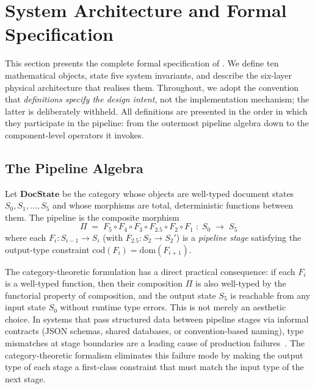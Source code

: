 \section{System Architecture and Formal Specification}
\label{sec:architecture}

This section presents the complete formal specification of \sys{}.
We define ten mathematical objects, state five system invariants, and describe the
six-layer physical architecture that realises them.
Throughout, we adopt the convention that \emph{definitions specify the design intent},
not the implementation mechanism; the latter is deliberately withheld.
All definitions are presented in the order in which they participate in the pipeline:
from the outermost pipeline algebra down to the component-level operators it invokes.

\subsection{The Pipeline Algebra}

\begin{definition}
\label{def:pipeline}
Let $\mathbf{DocState}$ be the category whose objects are well-typed document states
$S_0,S_1,\ldots,S_5$ and whose morphisms are total, deterministic functions between them.
The \sys{} pipeline is the composite morphism
\[
  \Pi \;=\; F_5 \circ F_4 \circ F_3 \circ F_{2.5} \circ F_2 \circ F_1
  \;:\; S_0 \;\longrightarrow\; S_5
\]
where each $F_i : S_{i-1} \to S_i$ (with $F_{2.5}: S_2 \to S_2'$) is a \emph{pipeline stage}
satisfying the output-type constraint $\mathrm{cod}(F_i)=\mathrm{dom}(F_{i+1})$.
\end{definition}

The category-theoretic formulation has a direct practical consequence: if each $F_i$
is a well-typed function, then their composition $\Pi$ is also well-typed by the
functorial property of composition, and the output state $S_5$ is reachable from any
input state $S_0$ without runtime type errors.
This is not merely an aesthetic choice.
In systems that pass structured data between pipeline stages via informal contracts
(JSON schemas, shared databases, or convention-based naming), type mismatches at stage
boundaries are a leading cause of production failures~\cite{akidau2015dataflow}.
The category-theoretic formalism eliminates this failure mode by making the output type
of each stage a first-class constraint that must match the input type of the next stage.

